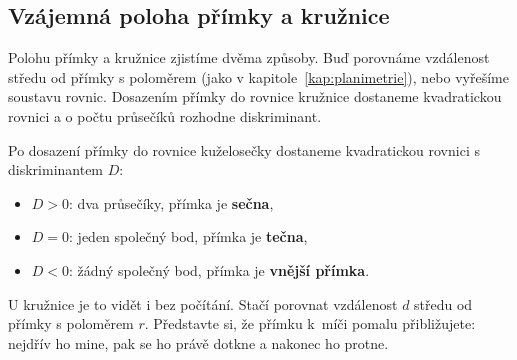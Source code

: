 \subsection{Vzájemná poloha přímky a kružnice}\label{sec:primka-kruznice}

Polohu přímky a kružnice zjistíme dvěma způsoby. Buď porovnáme vzdálenost středu od přímky s poloměrem (jako v kapitole~\ref{kap:planimetrie}), nebo vyřešíme soustavu rovnic. Dosazením přímky do rovnice kružnice dostaneme kvadratickou rovnici a o počtu průsečíků rozhodne diskriminant.

\begin{definitionbox}
  Po dosazení přímky do rovnice kuželosečky dostaneme kvadratickou rovnici s diskriminantem $D$:
  \begin{itemize}
    \item $D > 0$: dva průsečíky, přímka je \textbf{sečna},
    \item $D = 0$: jeden společný bod, přímka je \textbf{tečna},
    \item $D < 0$: žádný společný bod, přímka je \textbf{vnější přímka}.
  \end{itemize}
\end{definitionbox}

U kružnice je to vidět i bez počítání. Stačí porovnat vzdálenost $d$ středu od přímky s poloměrem $r$. Představte si, že přímku k~míči pomalu přibližujete: nejdřív ho mine, pak se ho právě dotkne a nakonec ho protne.

\begin{center}
\end{center}

